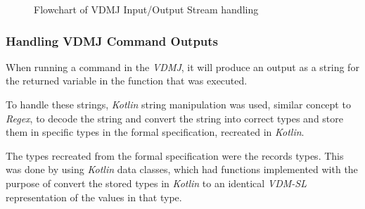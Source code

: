 \documentclass[../dissertation.tex]{subfiles}
\begin{document}
\begin{figure}[!htp]
  \centering
  \caption[VDMJ IO Stream]{Flowchart of VDMJ Input/Output Stream handling}
  \label{fig:vdmj-io}
\end{figure}


\subsubsection{Handling VDMJ Command Outputs}
When running a command in the \textit{VDMJ}, it will produce an output
as a string for the returned variable in the function that was executed.

To handle these strings, \textit{Kotlin} string manipulation was used,
similar concept to \textit{Regex},
to decode the string and convert the string into correct types and store them
in specific types in the formal specification, recreated in \textit{Kotlin}.

The types recreated from the formal specification were the records types.
This was done by using \textit{Kotlin} data classes,
which had functions implemented with the purpose of convert the stored types in \textit{Kotlin}
to an identical \textit{VDM-SL} representation of the values in that type.
\end{document}

